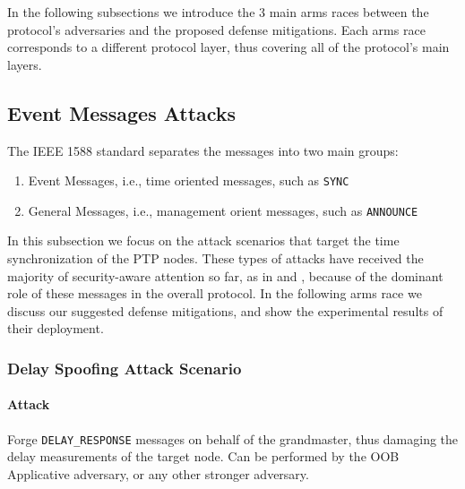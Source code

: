\documentclass[11pt]{article}
\begin{document}
In the following subsections we introduce the 3 main arms races between the protocol's adversaries and the proposed defense mitigations. Each arms race corresponds to a different protocol layer, thus covering all of the protocol's main layers.





\subsection{Event Messages Attacks}\label{attack:time}



The IEEE 1588 standard separates the messages into two main groups:

\begin{enumerate}

  \item Event Messages, i.e., time oriented messages, such as \texttt{SYNC}

  \item General Messages, i.e., management orient messages, such as \texttt{ANNOUNCE}

\end{enumerate}



In this subsection we focus on the attack scenarios that target the time synchronization of the PTP nodes. These types of attacks have received the majority of security-aware attention so far, as in \cite{Threat_Analysis} and \cite{Delay}, because of the dominant role of these messages in the overall protocol. In the following arms race we discuss our suggested defense mitigations, and show the experimental results of their deployment.



\subsubsection{Delay Spoofing Attack Scenario}\label{time:scenrio1}

\paragraph{Attack}

Forge \texttt{DELAY_RESPONSE} messages on behalf of the grandmaster, thus damaging the delay measurements of the target node. Can be performed by the OOB Applicative adversary, or any other stronger adversary.
\end{document}
